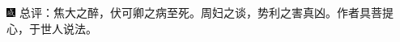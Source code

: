 {\includegraphics[width=3mm]{../Images/00005}  \kaishu 总评：焦大之醉，伏可卿之病至死。周妇之谈，势利之害真凶。作者具菩提心，于世人说法。}


%
%
%
